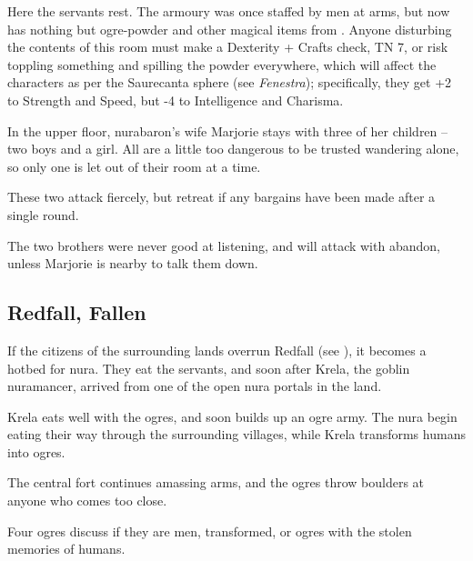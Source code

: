 \begin{multicols}{2}

Here the servants rest.
The armoury was once staffed by men at arms, but now has nothing but ogre-powder and other magical items from .
Anyone disturbing the contents of this room must make a Dexterity + Crafts check, TN 7, or risk toppling something and spilling the powder everywhere, which will affect the characters as per the Saurecanta sphere (see \textit{Fenestra}\iftoggle{aif}{\autopageref{saurecanta}}{});
specifically, they get +2 to Strength and Speed, but -4 to Intelligence and Charisma.


In the upper floor, \gls{nurabaron}'s wife Marjorie stays with three of her children -- two boys and a girl.
All are a little too dangerous to be trusted wandering alone, so only one is let out of their room at a time.

These two attack fiercely, but retreat if any bargains have been made after a single round.

The two brothers were never good at listening, and will attack with abandon, unless Marjorie is nearby to talk them down.


\subsection{Redfall, Fallen}
\label{redfallFallen}


If the citizens of the surrounding lands overrun Redfall (see ), it becomes a hotbed for nura.
They eat the servants, and soon after Krela, the goblin nuramancer, arrived from one of the open nura portals in the land.

Krela eats well with the ogres, and soon builds up an ogre army.
The nura begin eating their way through the surrounding villages, while Krela transforms humans into ogres.

The central fort continues amassing arms, and the ogres throw boulders at anyone who comes too close.


Four ogres discuss if they are men, transformed, or ogres with the stolen memories of humans.


\end{multicols}
